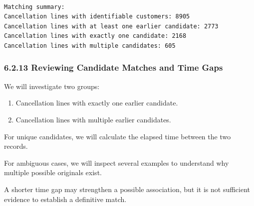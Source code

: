 \documentclass[11pt]{article}
\providecommand{\tightlist}{%
      \setlength{\itemsep}{0pt}\setlength{\parskip}{0pt}}
\begin{document}
    
    \begin{Verbatim}[commandchars=\\\{\}]

Matching summary:
Cancellation lines with identifiable customers: 8905
Cancellation lines with at least one earlier candidate: 2773
Cancellation lines with exactly one candidate: 2168
Cancellation lines with multiple candidates: 605
    \end{Verbatim}

    \subsubsection{6.2.13 Reviewing Candidate Matches and Time
Gaps}\label{reviewing-candidate-matches-and-time-gaps}

We will investigate two groups:

\begin{enumerate}
\def\labelenumi{\arabic{enumi}.}
\tightlist
\item
  Cancellation lines with exactly one earlier candidate.
\item
  Cancellation lines with multiple earlier candidates.
\end{enumerate}

For unique candidates, we will calculate the elapsed time between the
two records.

For ambiguous cases, we will inspect several examples to understand why
multiple possible originals exist.

A shorter time gap may strengthen a possible association, but it is not
sufficient evidence to establish a definitive match.
\end{document}
